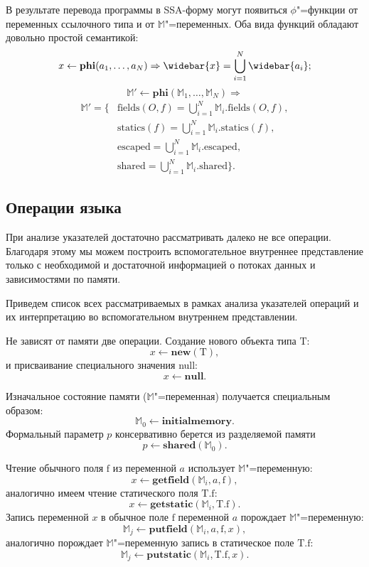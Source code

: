 \documentclass[14pt,titlepage,draft]{extarticle}
\newcommand{\java}{\eng{Java}\xspace}
\newcommand{\M}{\ensuremath{\mathbb{M}}}
\newcommand{\Mfield}[1]{\ensuremath{\mathrm{#1}}}
\let\mathphi\phi
\renewcommand{\phi}{\ensuremath{\mathphi}}
\newcommand{\type}[1]{\mathrm{#1}}
\newcommand{\field}[1]{\mathrm{#1}}
\newcommand{\sfield}[2]{\type{#1}.\field{#2}}
\newcommand{\op}[1]{\mathbf{#1}}
\newcommand{\pts}[1]{\widebar{#1}}
\begin{document}
      В результате перевода программы в SSA-форму могут появиться \phi"=функции
      от переменных ссылочного типа и от \M"=переменных. Оба вида функций
      обладают довольно простой семантикой:
      \[ x \gets \op{phi}(a_1, \ldots, a_N) \Rightarrow
         \pts{x} = \bigcup_{i = 1}^N \pts{a_i}; \]
      \[ \M' \gets \op{phi}(\M_1, \ldots, \M_N) \Rightarrow \]
      \[\begin{split}
        \M' = \{
        &\Mfield{fields}(O, f) = \bigcup_{i = 1}^N \M_i.\Mfield{fields}(O, f), \\
        &\Mfield{statics}(f) = \bigcup_{i = 1}^N \M_i.\Mfield{statics}(f), \\
        &\Mfield{escaped} = \bigcup_{i = 1}^N \M_i.\Mfield{escaped}, \\
        &\Mfield{shared} = \bigcup_{i = 1}^N \M_i.\Mfield{shared}
        \}.
      \end{split}\]


    \subsection{Операции языка \texorpdfstring{\java}{Java}}
      \label{section:java_ops}

      При анализе указателей достаточно рассматривать далеко не все операции.
      Благодаря этому мы можем построить вспомогательное внутреннее
      представление только с необходимой и достаточной информацией о потоках
      данных и зависимостями по памяти.

      Приведем список всех рассматриваемых в рамках анализа указателей операций
      и их интерпретацию во вспомогательном внутреннем представлении.

      Не зависят от памяти две операции. Создание нового объекта типа
      $\type{T}$:
      \[ x \gets \op{new}(\type{T}), \]
      и присваивание специального значения null:
      \[ x \gets \op{null}. \]

      Изначальное состояние памяти (\M"=переменная) получается специальным
      образом:
      \[ \M_0 \gets \op{initialmemory}. \]
      Формальный параметр $p$ консервативно берется из разделяемой памяти
      \[ p \gets \op{shared}(\M_0). \]

      Чтение обычного поля $\field{f}$ из переменной $a$ использует
      \M"=переменную:
      \[ x \gets \op{getfield}(\M_i, a, \field{f}), \]
      аналогично имеем чтение статического поля $\sfield{T}{f}$:
      \[ x \gets \op{getstatic}(\M_i, \sfield{T}{f}). \]
      Запись переменной $x$ в обычное поле $\field{f}$ переменной $a$ порождает
      \M"=переменную:
      \[ \M_j \gets \op{putfield}(\M_i, a, \field{f}, x), \]
      аналогично порождает \M"=переменную запись в статическое поле
      $\sfield{T}{f}$:
      \[ \M_j \gets \op{putstatic}(\M_i, \sfield{T}{f}, x). \]
\end{document}
